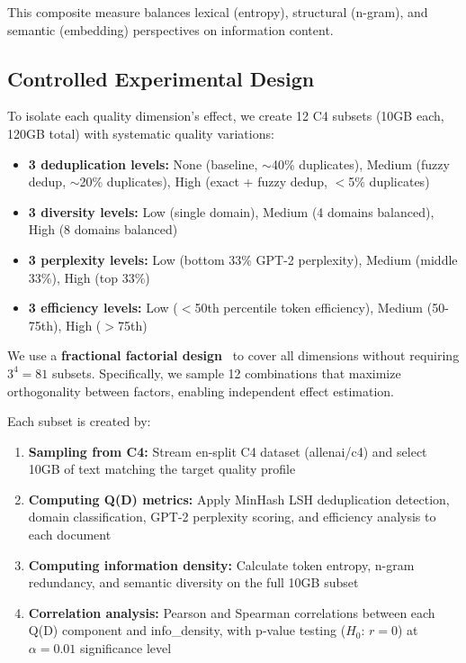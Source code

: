 This composite measure balances lexical (entropy), structural (n-gram), and semantic (embedding) perspectives on information content.

\subsection{Controlled Experimental Design}

To isolate each quality dimension's effect, we create 12 C4 subsets (10GB each, 120GB total) with systematic quality variations:

\begin{itemize}
\item \textbf{3 deduplication levels:} None (baseline, $\sim$40\% duplicates), Medium (fuzzy dedup, $\sim$20\% duplicates), High (exact + fuzzy dedup, $<$5\% duplicates)
\item \textbf{3 diversity levels:} Low (single domain), Medium (4 domains balanced), High (8 domains balanced)
\item \textbf{3 perplexity levels:} Low (bottom 33\% GPT-2 perplexity), Medium (middle 33\%), High (top 33\%)
\item \textbf{3 efficiency levels:} Low ($<$50th percentile token efficiency), Medium (50-75th), High ($>$75th)
\end{itemize}

We use a \textbf{fractional factorial design}~\cite{box2005statistics} to cover all dimensions without requiring $3^4 = 81$ subsets. Specifically, we sample 12 combinations that maximize orthogonality between factors, enabling independent effect estimation.

Each subset is created by:

\begin{enumerate}
\item \textbf{Sampling from C4:} Stream en-split C4 dataset (allenai/c4) and select 10GB of text matching the target quality profile
\item \textbf{Computing Q(D) metrics:} Apply MinHash LSH deduplication detection, domain classification, GPT-2 perplexity scoring, and efficiency analysis to each document
\item \textbf{Computing information density:} Calculate token entropy, n-gram redundancy, and semantic diversity on the full 10GB subset
\item \textbf{Correlation analysis:} Pearson and Spearman correlations between each Q(D) component and info\_density, with p-value testing ($H_0$: $r = 0$) at $\alpha = 0.01$ significance level
\end{enumerate}

